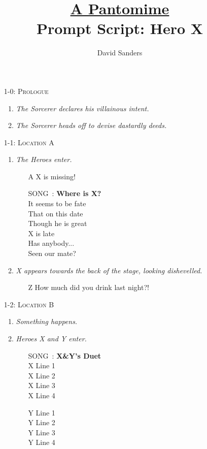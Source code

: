 \documentclass[10pt,a4paper]{article}
\title{\underline{A Pantomime} \\ \small Prompt Script: Hero X}
\author{David Sanders}
\newcommand{\scenetitle}[1]{{\Large{\textsc{#1}}}}
\newcommand{\note}[1]{\textit{#1}}
\newenvironment{sceneflow}{\begin{enumerate}[label=\roman*., leftmargin=0em]}{\end{enumerate}}
\newcounter{song}
\newcommand{\song}[0]{\refstepcounter{song}SONG~\thesong:}
\newcommand{\voc}[1]{{\large{\color{Green}#1}}}
\begin{document}
\maketitle

\begin{enumerate}
% 
\item [1-0:] \scenetitle{Prologue}
\begin{sceneflow}
\item \note{The Sorcerer declares his villainous intent.}
\item \note{The Sorcerer heads off to devise dastardly deeds.}
\end{sceneflow}
% 
\item [1-1:] \scenetitle{Location A}
\begin{sceneflow}
\item \note{The Heroes enter.}
\begin{itemize}
\item [A] X is missing!
\item [\song] \textbf{Where is X?} \\
It seems to be fate \\
That on this date \\
Though he is great \\
X is late \\
Has anybody... \\
Seen our mate?
\end{itemize}
\item \note{X appears towards the back of the stage, looking dishevelled.}
\begin{itemize}
\item [Z] How much did you drink last night?!
\end{itemize}
\end{sceneflow}
% 
\item [1-2:] \scenetitle{Location B}
\begin{sceneflow}
\item \note{Something happens.}
\item \note{Heroes X and Y enter.}
\begin{itemize}
\item [\song] \textbf{X\&Y's Duet} \\
\voc{
X Line 1 \\
X Line 2 \\
X Line 3 \\
X Line 4 }

\medskip
Y Line 1 \\
Y Line 2 \\
Y Line 3 \\
Y Line 4


\end{itemize}
\end{sceneflow}
\end{enumerate}
\end{document}
